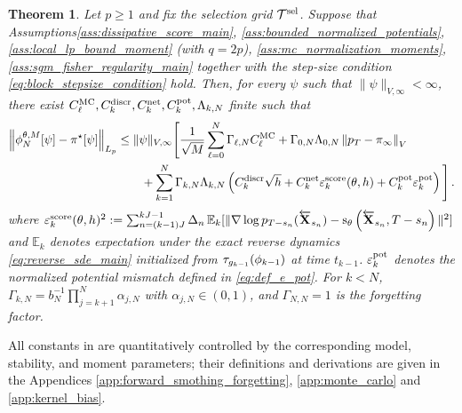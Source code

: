 \documentclass[11pt]{article}
\theoremstyle{plain}
\newtheorem{theorem}{Theorem}[section]
\theoremstyle{definition}
\theoremstyle{remark}
\begin{document}
\begin{theorem}
\label{thm:total_smc_kernel_bias_error}
Let $p\ge1$ and fix the selection grid $\mathcal T^{\rm sel}$. Suppose that Assumptions\ref{ass:dissipative_score_main}, \ref{ass:bounded_normalized_potentials}, \ref{ass:local_lp_bound_moment} (with $q=2p$), \ref{ass:mc_normalization_moments}, \ref{ass:sgm_fisher_regularity_main} together with the step-size condition
\eqref{eq:block_stepsize_condition} hold. Then, for every $\psi$ such that $\|\psi\|_{V,\infty}<\infty$, there exist $C_\ell^{\rm MC}, C_k^{\rm discr},C_k^{\rm net},C_k^{\rm pot}, \Lambda_{k,N}$ finite such that
\begin{align*}
\left\|\mcfilter{N}[\psi]-\pi^\star[\psi]\right\|_{L_p}
&\le \|\psi\|_{V,\infty}\Bigg[ \frac{1}{\sqrt M}
\sum_{\ell=0}^{N}\Gamma_{\ell,N} C_\ell^{\rm MC}
+\Gamma_{0,N}\Lambda_{0,N}\vnorm[p_T-\refmeas][V]\nonumber\\
&\qquad+\sum_{k=1}^{N}\Gamma_{k,N}\Lambda_{k,N}
\left( C_k^{\rm discr}\sqrt h
+C_k^{\rm net}\varepsilon_k^{\rm score}(\theta,h)
+ C_k^{\rm pot}\varepsilon_k^{\rm pot}\right)\Bigg] \eqsp.
\end{align*}
where $\varepsilon_k^{\rm score}(\theta,h)^2 \eqdef \sum_{n=(k-1)J}^{kJ-1} \Delta_n\, \mathbb E_k [ \| \nabla\log p_{T-s_n}(\Xola_{s_n})
- \scorenet[T-s_n][\Xola_{s_n}][\theta] \|^2 ]$ and $\mathbb E_k$ denotes expectation under the exact reverse dynamics \eqref{eq:reverse_sde_main} initialized from $\tau_{\pot{k-1}}(\filter{k-1})$ at time $t_{k-1}$. $\varepsilon_k^{\rm pot}$ denotes the normalized potential mismatch defined in \eqref{eq:def_e_pot}. For $k<N$, $\Gamma_{k,N}=b_N^{-1}\prod_{j=k+1}^{N}\alpha_{j,N}$ with
$\alpha_{j,N}\in(0,1)$, and $\Gamma_{N,N}=1$ is the forgetting factor.
\end{theorem}
All constants in  are quantitatively controlled by the corresponding model, stability, and moment parameters; their definitions and derivations are given in the Appendices \ref{app:forward_smothing_forgetting}, \ref{app:monte_carlo} and \ref{app:kernel_bias}.
\end{document}
